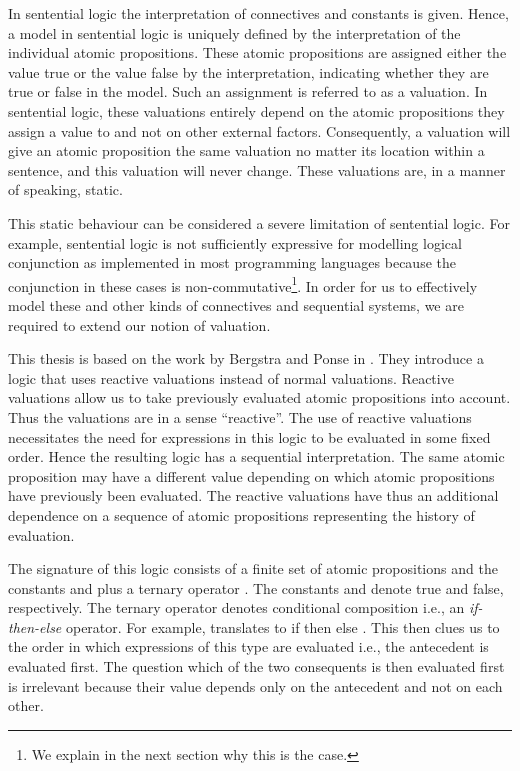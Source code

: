 \documentclass[a4paper,twoside,openright]{report}
\begin{document}
In sentential logic the interpretation of connectives and constants is given. Hence, a model in sentential logic is uniquely defined by the interpretation of the individual atomic propositions. These atomic propositions are assigned either the value true or the value false by the interpretation, indicating whether they are true or false in the model. Such an assignment is referred to as a valuation. In sentential logic, these valuations entirely depend on the atomic propositions they assign a value to and not on other external factors. Consequently, a valuation will give an atomic proposition the same valuation no matter its location within a sentence, and this valuation will never change. These valuations are, in a manner of speaking, static.

This static behaviour can be considered a severe limitation of sentential logic. For example, sentential logic is not sufficiently expressive for modelling logical conjunction as implemented in most programming languages because the conjunction in these cases is non-commutative\footnote{We explain in the next section why this is the case.}. In order for us to effectively model these and other kinds of connectives and sequential systems, we are required to extend our notion of valuation.

This thesis is based on the work by Bergstra and Ponse in \cite{main}. They introduce a logic that uses reactive valuations instead of normal valuations. Reactive valuations allow us to take previously evaluated atomic propositions into account. Thus the valuations are in a sense ``reactive''. The use of reactive valuations necessitates the need for expressions in this logic to be evaluated in some fixed order. Hence the resulting logic has a sequential interpretation. The same atomic proposition may have a different value depending on which atomic propositions have previously been evaluated. The reactive valuations have thus an additional dependence on a sequence of atomic propositions representing the history of evaluation.

The signature of this logic consists of a finite set of atomic propositions and the constants  and  plus a ternary operator . The constants  and  denote true and false, respectively. The ternary operator denotes conditional composition i.e., an \emph{if-then-else} operator. For example,  translates to if  then  else . This then clues us to the order in which expressions of this type are evaluated i.e., the antecedent is evaluated first. The question which of the two consequents is then evaluated first is irrelevant because their value depends only on the antecedent and not on each other.
\end{document}
